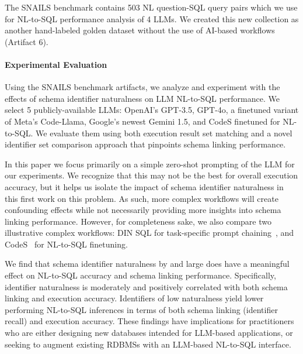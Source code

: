 The SNAILS benchmark contains 503 NL question-SQL query pairs which we use for NL-to-SQL performance analysis of 4 LLMs.
We created this new collection as another hand-labeled golden dataset without the use of AI-based workflows (Artifact 6).

\paragraph{\textbf{Experimental Evaluation}}

Using the SNAILS benchmark artifacts, we analyze and experiment with the effects of schema identifier naturalness on LLM NL-to-SQL performance.
We select 5 publicly-available LLMs: OpenAI's GPT-3.5, GPT-4o, a finetuned variant of Meta's Code-Llama, Google's newest Gemini 1.5, and CodeS finetuned for NL-to-SQL. We evaluate them using both execution result set matching and a novel identifier set comparison approach that pinpoints schema linking performance.

In this paper we focus primarily on a simple zero-shot prompting of the LLM for our experiments.
We recognize that this may not be the best for overall execution accuracy, but it helps us isolate the impact of schema identifier naturalness in this first work on this problem.
As such, more complex workflows will create confounding effects while not necessarily providing more insights into schema linking performance.
However, for completeness sake, we also compare two illustrative complex workflows: DIN SQL for task-specific prompt chaining~\cite{pourreza2023dinsql}, and CodeS~\cite{10.1145/3654930} for NL-to-SQL finetuning.

We find that schema identifier naturalness by and large does have a meaningful effect on NL-to-SQL accuracy and schema linking performance.
Specifically, identifier naturalness is moderately and positively correlated with both schema linking and execution accuracy.
Identifiers of low naturalness yield lower performing NL-to-SQL inferences in terms of both schema linking (identifier recall) and execution accuracy.
These findings have implications for practitioners who are either designing new databases intended for LLM-based applications, or seeking to augment existing RDBMSs with an LLM-based NL-to-SQL interface.

